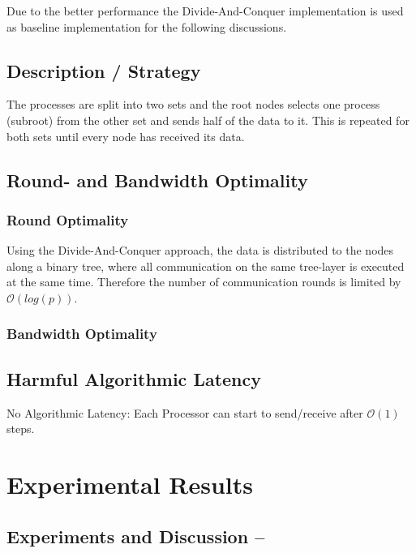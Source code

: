 Due to the better performance the Divide-And-Conquer implementation is used as baseline implementation for the following discussions.


\subsection{Description / Strategy}

The processes are split into two sets and the root nodes selects one process (subroot) from the other set and sends half of the data to it. This is repeated for both sets until every node has received its data.

\subsection{Round- and Bandwidth Optimality}

\subsubsection{Round Optimality}
Using the Divide-And-Conquer approach, the data is distributed to the nodes along a binary tree, where all communication on the same tree-layer is executed at the same time. Therefore the number of communication rounds is limited by $\mathcal{O}(log(p))$.

\subsubsection{Bandwidth Optimality}



\subsection{Harmful Algorithmic Latency}

No Algorithmic Latency: Each Processor can start to send/receive after $\mathcal{O}(1)$ steps.

\section{Experimental Results}

\subsection{Experiments and Discussion -- \mygather}

